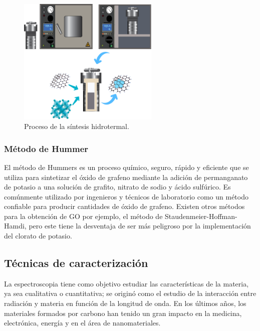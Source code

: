 \documentclass[12pt]{article}
\begin{document}
         \begin{figure}[H]
    	   \begin{center}
     	  	\includegraphics[width = 0.6\textwidth]{Imagenes/hidrotermal.png}
     	  	\caption{Proceso de la síntesis hidrotermal.}\label{fig:hidrotermal}  
    	   \end{center} 
        \end{figure}
     
        
        
        \subsubsection{Método de Hummer}
        El método de Hummers es un proceso químico, seguro, rápido y eficiente que se utiliza para sintetizar el óxido de grafeno mediante la adición de permanganato de potasio a una solución de grafito, nitrato de sodio y ácido sulfúrico. Es comúnmente utilizado por ingenieros y técnicos de laboratorio como un método confiable para producir cantidades de óxido de grafeno. Existen otros métodos para la obtención de GO por ejemplo, el método de Staudenmeier-Hoffman-Hamdi, pero este tiene la desventaja de ser más peligroso por la implementación del clorato de potasio.\cite{IEEEreferencias:Ref1}
        
    \subsection{Técnicas de caracterización}
    La espectroscopia tiene como objetivo estudiar las características de la materia, ya sea cualitativa o cuantitativa; se originó como el estudio de la interacción entre radiación y materia en función de la longitud de onda. En los últimos años, los materiales formados por carbono han tenido un gran impacto en la medicina, electrónica, energía y en el área de nanomateriales.\vspace{1em} %
    
\end{document}
